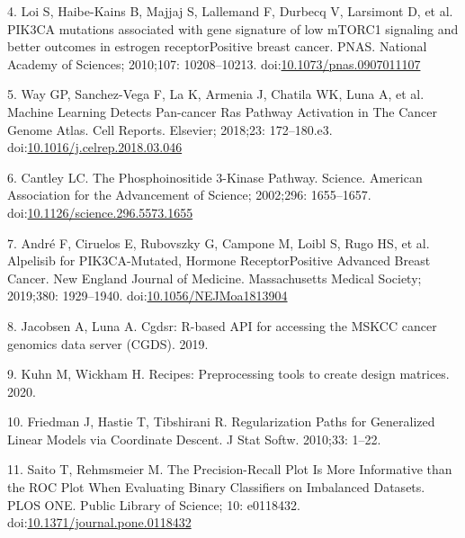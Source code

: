 \documentclass[10pt,letterpaper]{article}
\begin{document}
\leavevmode\hypertarget{ref-loiPIK3CAMutationsAssociated2010}{}%
4. Loi S, Haibe-Kains B, Majjaj S, Lallemand F, Durbecq V, Larsimont D,
et al. PIK3CA mutations associated with gene signature of low mTORC1
signaling and better outcomes in estrogen receptorPositive breast
cancer. PNAS. National Academy of Sciences; 2010;107: 10208--10213.
doi:\href{https://doi.org/10.1073/pnas.0907011107}{10.1073/pnas.0907011107}

\leavevmode\hypertarget{ref-way_2018_machine_cellreports}{}%
5. Way GP, Sanchez-Vega F, La K, Armenia J, Chatila WK, Luna A, et al.
Machine Learning Detects Pan-cancer Ras Pathway Activation in The Cancer
Genome Atlas. Cell Reports. Elsevier; 2018;23: 172--180.e3.
doi:\href{https://doi.org/10.1016/j.celrep.2018.03.046}{10.1016/j.celrep.2018.03.046}

\leavevmode\hypertarget{ref-cantleyPhosphoinositide3KinasePathway2002}{}%
6. Cantley LC. The Phosphoinositide 3-Kinase Pathway. Science. American
Association for the Advancement of Science; 2002;296: 1655--1657.
doi:\href{https://doi.org/10.1126/science.296.5573.1655}{10.1126/science.296.5573.1655}

\leavevmode\hypertarget{ref-andre_2019_alpelisib_nengljmeda}{}%
7. André F, Ciruelos E, Rubovszky G, Campone M, Loibl S, Rugo HS, et al.
Alpelisib for PIK3CA-Mutated, Hormone ReceptorPositive Advanced Breast
Cancer. New England Journal of Medicine. Massachusetts Medical Society;
2019;380: 1929--1940.
doi:\href{https://doi.org/10.1056/NEJMoa1813904}{10.1056/NEJMoa1813904}

\leavevmode\hypertarget{ref-jacobsenCgdsrRbasedAPI2019}{}%
8. Jacobsen A, Luna A. Cgdsr: R-based API for accessing the MSKCC cancer
genomics data server (CGDS). 2019.

\leavevmode\hypertarget{ref-kuhnRecipesPreprocessingTools2020}{}%
9. Kuhn M, Wickham H. Recipes: Preprocessing tools to create design
matrices. 2020.

\leavevmode\hypertarget{ref-friedmanRegularizationPathsGeneralized2010}{}%
10. Friedman J, Hastie T, Tibshirani R. Regularization Paths for
Generalized Linear Models via Coordinate Descent. J Stat Softw. 2010;33:
1--22.

\leavevmode\hypertarget{ref-saitoPrecisionRecallPlotMore2015}{}%
11. Saito T, Rehmsmeier M. The Precision-Recall Plot Is More Informative
than the ROC Plot When Evaluating Binary Classifiers on Imbalanced
Datasets. PLOS ONE. Public Library of Science; 10: e0118432.
doi:\href{https://doi.org/10.1371/journal.pone.0118432}{10.1371/journal.pone.0118432}
\end{document}

